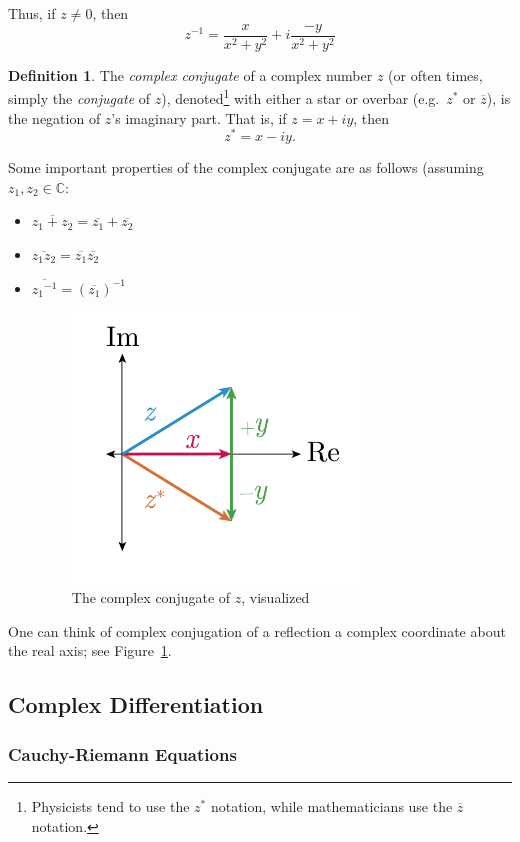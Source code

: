 \documentclass[a4paper]{article}
\numberwithin{equation}{subsection}
\theoremstyle{definition}
\newtheorem{definition}{Definition}[section]
\theoremstyle{remark}
\newenvironment{definitionSR}
{
\begin{siderules}
\begin{definition}
}
{
\end{definition}
\end{siderules}
}
\newcommand{\Complex}{\mathbb{C}}
\newcommand{\inv}[1]{
	{#1}^{-1}
}
\newcommand*{\conjugate}[1]{\overline{#1}}
\newcommand*{\conj}[1]{{#1}^*}
\begin{document}
Thus, if $z \neq 0$, then
\[
\inv{z} = \frac{x}{x^2+y^2} + i \frac{-y}{x^2+y^2}
\]
\begin{definitionSR}
The \textit{complex conjugate} of a complex number $z$ (or often times, simply the \textit{conjugate} of $z$), denoted\footnote{Physicists tend to use the $\conj{z}$ notation, while mathematicians use the $\conjugate{z}$ notation.} with either a star or overbar (e.g.\ $\conj{z}$ or $\conjugate{z}$), is the negation of $z$'s imaginary part. That is, if $z = x+iy$, then
\[
\conj{z} = x-iy.
\]

\end{definitionSR}
Some important properties of the complex conjugate are as follows (assuming $z_1, z_2 \in \Complex$:
\begin{itemize}
\item $\conjugate{z_1+z_2} = \conjugate{z_1} + \conjugate{z_2}$
\item $\conjugate{z_1 z_2} = \conjugate{z_1} \conjugate{z_2}$
\item $\conjugate{\inv{z_1}} = \inv{(\conjugate{z_1})}$

\begin{figure}[h]
	\centering
	\caption{The complex conjugate of $z$, visualized}
	\label{fig:conjugate}
	\includegraphics[width=3in]{complex_number_diagram-03}
\end{figure}
\end{itemize}
One can think of complex conjugation of a reflection a complex coordinate about the real axis; see Figure~\ref{fig:conjugate}.

\subsection{Complex Differentiation}
\subsubsection{Cauchy-Riemann Equations}
\end{document}
